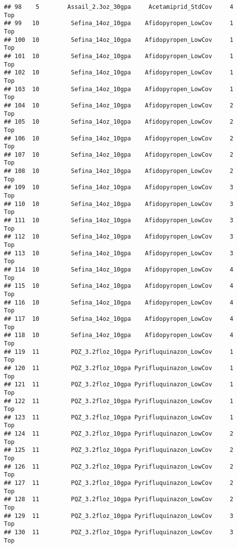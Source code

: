 \documentclass[
]{article}
\begin{document}
\begin{verbatim}
## 98    5        Assail_2.3oz_30gpa     Acetamiprid_StdCov     4           Top
## 99   10         Sefina_14oz_10gpa    Afidopyropen_LowCov     1           Top
## 100  10         Sefina_14oz_10gpa    Afidopyropen_LowCov     1           Top
## 101  10         Sefina_14oz_10gpa    Afidopyropen_LowCov     1           Top
## 102  10         Sefina_14oz_10gpa    Afidopyropen_LowCov     1           Top
## 103  10         Sefina_14oz_10gpa    Afidopyropen_LowCov     1           Top
## 104  10         Sefina_14oz_10gpa    Afidopyropen_LowCov     2           Top
## 105  10         Sefina_14oz_10gpa    Afidopyropen_LowCov     2           Top
## 106  10         Sefina_14oz_10gpa    Afidopyropen_LowCov     2           Top
## 107  10         Sefina_14oz_10gpa    Afidopyropen_LowCov     2           Top
## 108  10         Sefina_14oz_10gpa    Afidopyropen_LowCov     2           Top
## 109  10         Sefina_14oz_10gpa    Afidopyropen_LowCov     3           Top
## 110  10         Sefina_14oz_10gpa    Afidopyropen_LowCov     3           Top
## 111  10         Sefina_14oz_10gpa    Afidopyropen_LowCov     3           Top
## 112  10         Sefina_14oz_10gpa    Afidopyropen_LowCov     3           Top
## 113  10         Sefina_14oz_10gpa    Afidopyropen_LowCov     3           Top
## 114  10         Sefina_14oz_10gpa    Afidopyropen_LowCov     4           Top
## 115  10         Sefina_14oz_10gpa    Afidopyropen_LowCov     4           Top
## 116  10         Sefina_14oz_10gpa    Afidopyropen_LowCov     4           Top
## 117  10         Sefina_14oz_10gpa    Afidopyropen_LowCov     4           Top
## 118  10         Sefina_14oz_10gpa    Afidopyropen_LowCov     4           Top
## 119  11         PQZ_3.2floz_10gpa Pyrifluquinazon_LowCov     1           Top
## 120  11         PQZ_3.2floz_10gpa Pyrifluquinazon_LowCov     1           Top
## 121  11         PQZ_3.2floz_10gpa Pyrifluquinazon_LowCov     1           Top
## 122  11         PQZ_3.2floz_10gpa Pyrifluquinazon_LowCov     1           Top
## 123  11         PQZ_3.2floz_10gpa Pyrifluquinazon_LowCov     1           Top
## 124  11         PQZ_3.2floz_10gpa Pyrifluquinazon_LowCov     2           Top
## 125  11         PQZ_3.2floz_10gpa Pyrifluquinazon_LowCov     2           Top
## 126  11         PQZ_3.2floz_10gpa Pyrifluquinazon_LowCov     2           Top
## 127  11         PQZ_3.2floz_10gpa Pyrifluquinazon_LowCov     2           Top
## 128  11         PQZ_3.2floz_10gpa Pyrifluquinazon_LowCov     2           Top
## 129  11         PQZ_3.2floz_10gpa Pyrifluquinazon_LowCov     3           Top
## 130  11         PQZ_3.2floz_10gpa Pyrifluquinazon_LowCov     3           Top

\end{verbatim}
\end{document}

